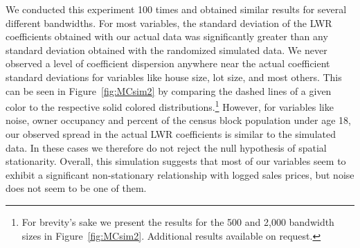 \documentclass{article}\usepackage{graphicx, color}
\begin{document}
We conducted this experiment 100 times and obtained similar results for several different bandwidths. For most variables, the standard deviation of the LWR coefficients obtained with our actual data was significantly greater than any standard deviation obtained with the randomized simulated data. We never observed a level of coefficient dispersion anywhere near the actual coefficient standard deviations for variables like house size, lot size, and most others. This can be seen in Figure~\ref{fig:MCsim2} by comparing the dashed lines of a given color to the respective solid colored distributions.\footnote{For brevity's sake we present the results for the 500 and 2,000 bandwidth sizes in Figure~\ref{fig:MCsim2}. Additional results available on request.} However, for variables like noise, owner occupancy and percent of the census block population under age 18, our observed spread in the actual LWR coefficients is similar to the simulated data. In these cases we therefore do not reject the null hypothesis of spatial stationarity. Overall, this simulation suggests that most of our variables seem to exhibit a significant non-stationary relationship with logged sales prices, but noise does not seem to be one of them.
\end{document}
